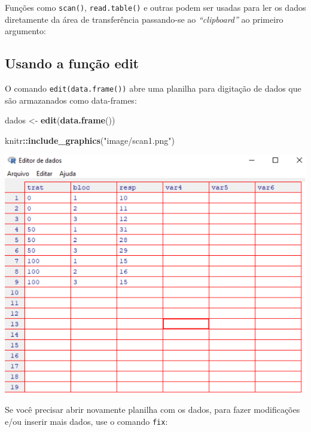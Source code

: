 \documentclass[
]{book}
\newenvironment{Shaded}{\begin{snugshade}}{\end{snugshade}}
\newcommand{\KeywordTok}[1]{\textcolor[rgb]{0.13,0.29,0.53}{\textbf{#1}}}
\newcommand{\NormalTok}[1]{#1}
\newcommand{\OperatorTok}[1]{\textcolor[rgb]{0.81,0.36,0.00}{\textbf{#1}}}
\newcommand{\StringTok}[1]{\textcolor[rgb]{0.31,0.60,0.02}{#1}}
\begin{document}
Funções como \texttt{scan()}, \texttt{read.table()} e outras podem ser usadas para ler os dados diretamente da área de transferência passando-se ao \emph{``clipboard''} ao primeiro argumento:

\hypertarget{usando-a-funuxe7uxe3o-edit}{%
\subsection{Usando a função edit}\label{usando-a-funuxe7uxe3o-edit}}

O comando \texttt{edit(data.frame())} abre uma planilha para digitação de dados que são armazanados como data-frames:

\begin{Shaded}
\begin{Highlighting}[]
\NormalTok{dados <-}\StringTok{ }\KeywordTok{edit}\NormalTok{(}\KeywordTok{data.frame}\NormalTok{())}
\end{Highlighting}
\end{Shaded}

\begin{Shaded}
\begin{Highlighting}[]
\NormalTok{knitr}\OperatorTok{::}\KeywordTok{include_graphics}\NormalTok{(}\StringTok{"image/scan1.png"}\NormalTok{)}
\end{Highlighting}
\end{Shaded}

\includegraphics[width=8.26in]{image/scan1}

Se você precisar abrir novamente planilha com os dados, para fazer modificações e/ou inserir mais dados, use o comando \texttt{fix}:
\end{document}
